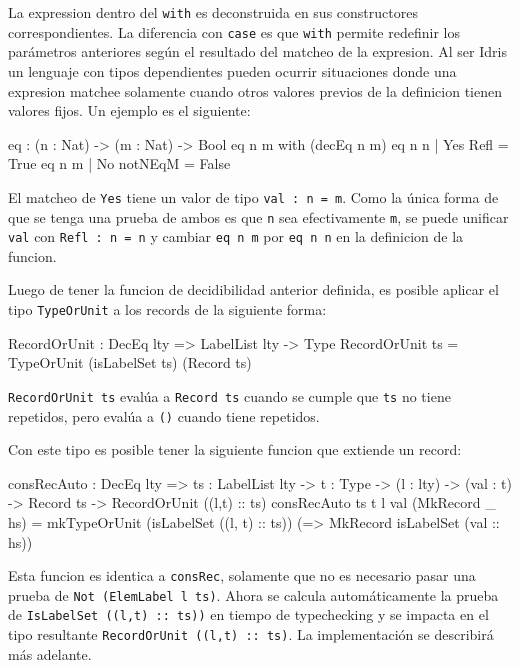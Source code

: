 La expression dentro del \texttt{with} es deconstruida en sus constructores correspondientes. La diferencia con \texttt{case} es que \texttt{with} permite redefinir los parámetros anteriores según el resultado del matcheo de la expresion. Al ser Idris un lenguaje con tipos dependientes pueden ocurrir situaciones donde una expresion matchee solamente cuando otros valores previos de la definicion tienen valores fijos. Un ejemplo es el siguiente:

\begin{code}
eq : (n : Nat) -> (m : Nat) -> Bool  
eq n m  with (decEq n m)
  eq n n | Yes Refl = True
  eq n m | No notNEqM = False
\end{code}

El matcheo de \texttt{Yes} tiene un valor de tipo \texttt{val : n = m}. Como la única forma de que se tenga una prueba de ambos es que \texttt{n} sea efectivamente \texttt{m}, se puede unificar \texttt{val} con \texttt{Refl : n = n} y cambiar \texttt{eq n m} por \texttt{eq n n} en la definicion de la funcion.

Luego de tener la funcion de decidibilidad anterior definida, es posible aplicar el tipo \texttt{TypeOrUnit} a los records de la siguiente forma:

\begin{code}
RecordOrUnit : DecEq lty => LabelList lty -> Type
RecordOrUnit ts = TypeOrUnit (isLabelSet ts) (Record ts)
\end{code}

\texttt{RecordOrUnit ts} evalúa a \texttt{Record ts} cuando se cumple que \texttt{ts} no tiene repetidos, pero evalúa a \texttt{()} cuando tiene repetidos.

Con este tipo es posible tener la siguiente funcion que extiende un record:

\begin{code}
consRecAuto : DecEq lty => {ts : LabelList lty} -> 
  {t : Type} -> (l : lty) -> (val : t) -> Record ts -> 
  RecordOrUnit ((l,t) :: ts)
consRecAuto {ts} {t} l val (MkRecord _ hs) = 
  mkTypeOrUnit (isLabelSet ((l, t) :: ts)) 
  (\isLabelSet => MkRecord isLabelSet (val :: hs))
\end{code}

Esta funcion es identica a \texttt{consRec}, solamente que no es necesario pasar una prueba de \texttt{Not (ElemLabel l ts)}. Ahora se calcula automáticamente la prueba de \texttt{IsLabelSet ((l,t) :: ts))}  en tiempo de typechecking y se impacta en el tipo resultante \texttt{RecordOrUnit ((l,t) :: ts)}. La implementación se describirá más adelante.

